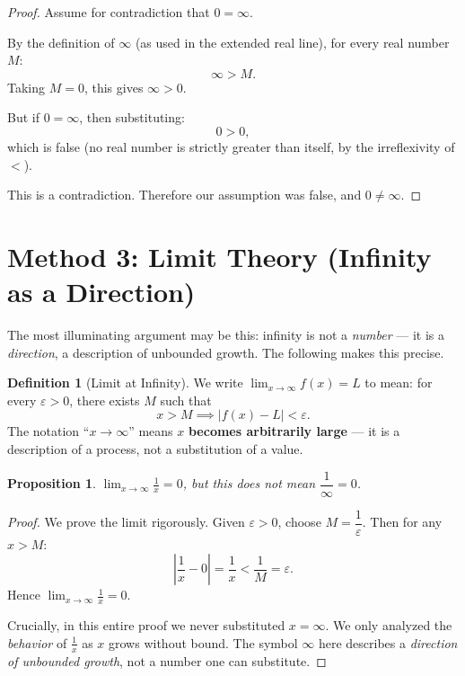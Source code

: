 \documentclass[12pt, a4paper]{article}
\newtheorem{proposition}[theorem]{Proposition}
\theoremstyle{definition}
\newtheorem{definition}{Definition}
\theoremstyle{remark}
\begin{document}
\begin{proof}
Assume for contradiction that $0 = \infty$.

By the definition of $\infty$ (as used in the extended real line), for every real number $M$:
\[
\infty > M.
\]
Taking $M = 0$, this gives $\infty > 0$.

But if $0 = \infty$, then substituting:
\[
0 > 0,
\]
which is false (no real number is strictly greater than itself, by the irreflexivity of $<$).

This is a contradiction. Therefore our assumption was false, and $0 \neq \infty$.
\end{proof}

\section{Method 3: Limit Theory (Infinity as a Direction)}

The most illuminating argument may be this: infinity is not a \emph{number} — it is a \emph{direction}, a description of unbounded growth. The following makes this precise.

\begin{definition}[Limit at Infinity]
We write $\displaystyle\lim_{x \to \infty} f(x) = L$ to mean: for every $\varepsilon > 0$, there exists $M$ such that
\[
x > M \implies |f(x) - L| < \varepsilon.
\]
The notation ``$x \to \infty$'' means $x$ \textbf{becomes arbitrarily large} — it is a description of a process, not a substitution of a value.
\end{definition}

\begin{proposition}
$\displaystyle\lim_{x \to \infty} \frac{1}{x} = 0$, but this does \emph{not} mean $\dfrac{1}{\infty} = 0$.
\end{proposition}

\begin{proof}
We prove the limit rigorously. Given $\varepsilon > 0$, choose $M = \dfrac{1}{\varepsilon}$. Then for any $x > M$:
\[
\left|\frac{1}{x} - 0\right| = \frac{1}{x} < \frac{1}{M} = \varepsilon.
\]
Hence $\displaystyle\lim_{x \to \infty} \frac{1}{x} = 0$.

Crucially, in this entire proof we never substituted $x = \infty$. We only analyzed the \emph{behavior} of $\frac{1}{x}$ as $x$ grows without bound. The symbol $\infty$ here describes a \emph{direction of unbounded growth}, not a number one can substitute.
\end{proof}
\end{document}

